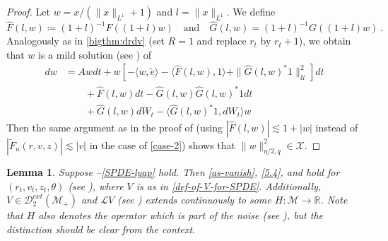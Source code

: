\documentclass[final]{amsart}
\newtheorem{lem}[thm]{Lemma}
\numberwithin{thm}{section}
\numberwithin{equation}{section}
\newcommand{\U}{\mathcal{U}}
\newcommand{\mcM}{\mathcal{M}}
\newcommand{\R}{\mathbb{R}}
\newcommand{\inv}{\mathcal{M}_+}
\newcommand{\Dme}{\mathcal{D}^{ext}}
\newcommand{\Ll}{\mathcal{L}}
\newcommand{\ip}[2]{\langle #1, #2 \rangle}
\newcommand{\X}{\mathcal{X}}
\begin{document}
\begin{proof}
    Let $w = x/(\|x\|_{L^1}+1)$ and $l = \|x\|_{L^1}$. We define
    \begin{equation}\label{eq:hat-g}
        \hat F(l,w) \coloneqq (1+l)^{-1}F((1+l)w) \quad \text{and} \quad \hat G(l,w) = (1+l)^{-1}G((1+l)w) \,.
    \end{equation}
    Analogously as in \ref{bigthm:drdv} (set $R = 1$ and replace $r_t$ by $r_t+1$), we obtain that $w$ is a mild solution (see ) of
    \begin{align*}
        dw &= Awdt + w[-\ip{w}{\tilde e} - \ip{\hat F(l,w)}{1} + \|\hat G(l,w)^*1\|_\U^2]dt \\
            &\qquad + \hat F(l,w)dt - \hat G(l,w)\hat G(l,w)^*1dt \\
            &\qquad + \hat G(l,w)dW_t- \ip{\hat G(l,w)^*1}{dW_t}w
    \end{align*}
    Then the same argument as in the proof of  (using $|\hat F(l,w)| \lesssim 1+|w|$ instead of $|\tilde F_u(r,v,z)| \lesssim |v|$ in the case of \ref{case-2}) shows that $\|w\|_{\eta/2,q}^2 \in \X$.
\end{proof}

\begin{lem}\label{lem:compactness-for-spde}
Suppose --\ref{SPDE-lyap} hold.
    Then \ref{as-vanish}, \ref{5.4}, and  hold for $(r_t,v_t,z_t,\theta)$ (see ), where $V$ is as in \eqref{def-of-V-for-SPDE}. Additionally, $V \in \Dme_2(\inv)$ and $\Ll V$ (see ) extends continuously to some $H: \mcM \to \R$.
   Note that $H$ also denotes the operator which is part of the noise (see ), but the distinction should be clear from the context.  
    
\end{lem}
\end{document}
